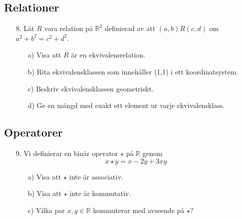 \documentclass{article}
\begin{document}
\subsection*{Relationer}
\begin{enumerate}
\item[8.] Låt $R$ vara relation på $\mathbb{R}^2$ definierad av att $(a,b)R(c,d)$ om $a^2+b^2=c^2+d^2$.
\begin{itemize}
\item[a)] Visa att $R$ är en ekvivalensrelation.
\item[b)] Rita ekvivalensklassen som innehåller (1,1) i ett koordinatsystem.
\item[c)] Beskriv ekvivalensklassen geometriskt.
\item[d)] Ge en mängd med exakt ett element ur varje ekvivalensklass.
\end{itemize}
\end{enumerate}

\subsection*{Operatorer}
\begin{enumerate}
\item[9.] Vi definierar en binär operator $\star$ på $\mathbb{R}$ genom
\[x \star y = x-2y+3xy\]
\begin{itemize}
\item[a)] Visa att $\star$ inte är associativ.
\item[b)] Visa att $\star$ inte är kommutativ.
\item[c)] Vilka par $x,y \in \mathbb{R}$ kommuterar med avseende på $\star$?
\end{itemize}
\end{enumerate}
\end{document}
